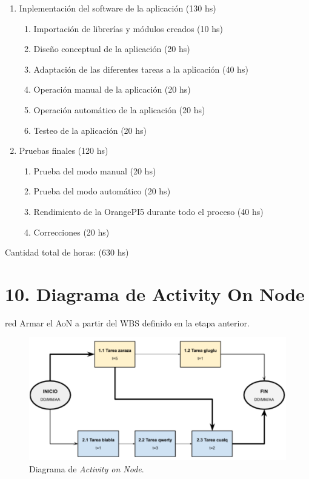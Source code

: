 \documentclass[
11pt, %
]{charter}
\begin{document}
\begin{enumerate}
\item Inplementación del software de la aplicación (130 hs)
	\begin{enumerate}
	\item Importación de librerías y módulos creados (10 hs)
	\item Diseño conceptual de la aplicación (20 hs)
	\item Adaptación de las diferentes tareas a la aplicación  (40 hs)
	\item Operación manual de la aplicación (20 hs)
	\item Operación automático de la aplicación (20 hs)
	\item Testeo de la aplicación (20 hs)
	\end{enumerate}
\item Pruebas finales (120 hs)
	\begin{enumerate}
	\item Prueba del modo manual (20 hs)
	\item Prueba del modo automático (20 hs)
	\item Rendimiento de la OrangePI5 durante todo el proceso (40 hs)
	\item Correcciones (20 hs)
	\end{enumerate}
\end{enumerate}

Cantidad total de horas: (630 hs)





\section{10. Diagrama de Activity On Node}
\label{sec:AoN}

\begin{consigna}{red}
Armar el AoN a partir del WBS definido en la etapa anterior. 



\end{consigna}

\begin{figure}[htpb]
\centering 
\includegraphics[width=.8\textwidth]{./Figuras/AoN.png}
\caption{Diagrama de \textit{Activity on Node}.}
\label{fig:AoN}
\end{figure}
\end{document}
